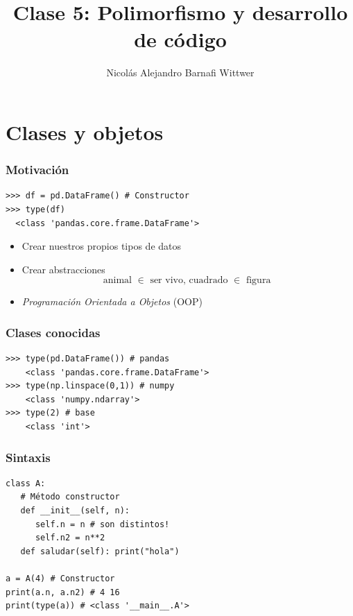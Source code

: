 \documentclass[14pt,aspectratio=169,xcolor=dvipsnames]{beamer}
\title[short title]{Clase 5: Polimorfismo y desarrollo de código}
\subtitle{}
\author[NA Barnafi] {Nicolás Alejandro Barnafi Wittwer}
\institute[UC|CMM] 
{
    Pontificia Universidad Católica de Chile \\
    Centro de Modelamiento Matemático
}
\date{}
\begin{document}
\begin{frame}
    \maketitle
\end{frame}
\section{Clases y objetos}
\begin{frame}[fragile]\frametitle{Motivación}
    \begin{verbatim}
>>> df = pd.DataFrame() # Constructor
>>> type(df)
  <class 'pandas.core.frame.DataFrame'>
    \end{verbatim}
    \begin{itemize}
        \item Crear nuestros propios tipos de datos
        \item Crear abstracciones 
    \[ \text{animal $\in$ ser vivo, cuadrado $\in$ figura }\]
        \item \emph{Programación Orientada a Objetos} (OOP)
    \end{itemize}
\end{frame}
\begin{frame}[fragile]\frametitle{Clases conocidas}
    \begin{verbatim}
>>> type(pd.DataFrame()) # pandas
    <class 'pandas.core.frame.DataFrame'>
>>> type(np.linspace(0,1)) # numpy
    <class 'numpy.ndarray'>
>>> type(2) # base
    <class 'int'>
    \end{verbatim}
\end{frame}
\begin{frame}[fragile]\frametitle{Sintaxis}
    \begin{verbatim}
class A:
   # Método constructor
   def __init__(self, n):
      self.n = n # son distintos!
      self.n2 = n**2
   def saludar(self): print("hola")

a = A(4) # Constructor
print(a.n, a.n2) # 4 16
print(type(a)) # <class '__main__.A'>
    \end{verbatim}

\end{frame}
\end{document}
